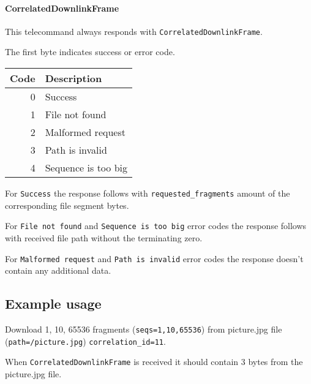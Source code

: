 \paragraph{CorrelatedDownlinkFrame}

This telecommand always responds with \texttt{CorrelatedDownlinkFrame}.

The first byte indicates success or error code.

\begin{tabular}{r | l}
	Code & Description \\ \hline
	0 		& Success \\
	1 		& File not found \\
	2 		& Malformed request \\
	3 		& Path is invalid \\
	4 		& Sequence is too big
\end{tabular}

For \texttt{Success} the response follows with \texttt{requested\_fragments} amount of the corresponding file segment bytes.

For \texttt{File not found} and \texttt{Sequence is too big} error codes the response follows with received file path without the terminating zero.

For \texttt{Malformed request} and \texttt{Path is invalid} error codes the response doesn't contain any additional data.

\subsection{Example usage}
Download 1, 10, 65536 fragments (\texttt{seqs=1,10,65536}) from picture.jpg file (\texttt{path=/picture.jpg}) \texttt{correlation\_id=11}.


When \texttt{CorrelatedDownlinkFrame} is received it should contain 3 bytes from the picture.jpg file.
